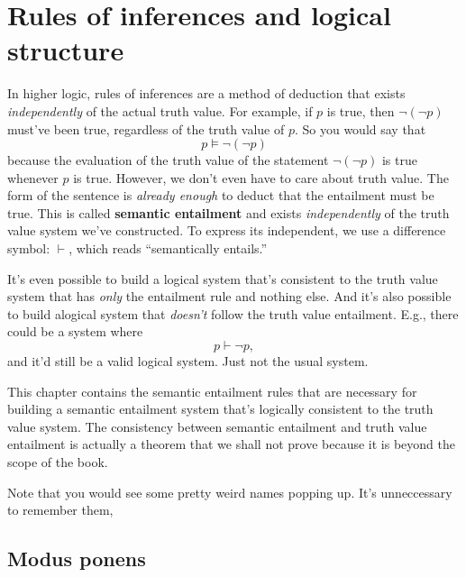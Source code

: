 \section{Rules of inferences and logical structure}

In higher logic, rules of inferences are a method of deduction that exists \emph{independently} of the actual truth value. For example, if \(p\) is true, then \(\neg(\neg p)\) must've been true, regardless of the truth value of \(p\). So you would say that
\begin{equation}
  p \models \neg (\neg p)
\end{equation}
because the evaluation of the truth value of the statement \(\neg (\neg p)\) is true whenever \(p\) is true. However, we don't even have to care about truth value. The form of the sentence is \emph{already enough} to deduct that the entailment must be true. This is called \textbf{semantic entailment} and exists \emph{independently} of the truth value system we've constructed. To express its independent, we use a difference symbol: \(\vdash\), which reads \enquote{semantically entails.}

It's even possible to build a logical system that's consistent to the truth value system that has \emph{only} the entailment rule and nothing else. And it's also possible to build alogical system that \emph{doesn't} follow the truth value entailment. E.g., there could be a system where
\begin{equation}
  p \vdash \neg p,
\end{equation}
and it'd still be a valid logical system. Just not the usual system.

This chapter contains the semantic entailment rules that are necessary for building a semantic entailment system that's logically consistent to the truth value system. The consistency between semantic entailment and truth value entailment is actually a theorem that we shall not prove because it is beyond the scope of the book.

Note that you would see some pretty weird names popping up. It's unneccessary to remember them,

\subsection{Modus ponens}

